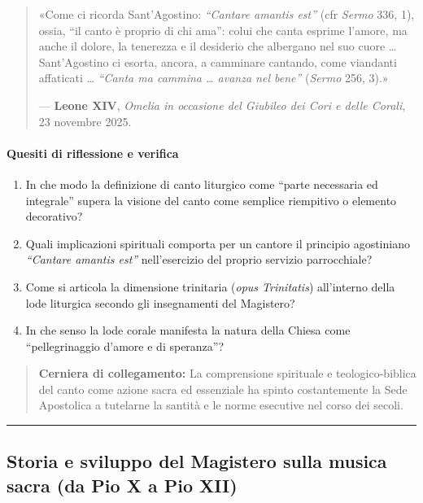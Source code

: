 \documentclass[12pt,a4paper]{article}
\begin{document}
	\begin{quote}
		«Come ci ricorda Sant'Agostino: \emph{``Cantare amantis est''} (cfr \emph{Sermo} 336, 1), ossia, ``il canto è proprio di chi ama'': colui che canta esprime l'amore, ma anche il dolore, la tenerezza e il desiderio che albergano nel suo cuore \ldots{} Sant'Agostino ci esorta, ancora, a camminare cantando, come viandanti affaticati \ldots{} \emph{``Canta ma cammina \ldots{} avanza nel bene''} (\emph{Sermo} 256, 3).»
		
		--- \textbf{Leone XIV}, \emph{Omelia in occasione del Giubileo dei Cori e delle Corali}, 23 novembre 2025.
	\end{quote}
	
	\paragraph{Quesiti di riflessione e verifica}\label{quesiti-di-riflessione-e-verifica}
	
	\begin{enumerate}[label=\arabic*.,leftmargin=*]
		\item In che modo la definizione di canto liturgico come ``parte necessaria ed integrale'' supera la visione del canto come semplice riempitivo o elemento decorativo?
		\item Quali implicazioni spirituali comporta per un cantore il principio agostiniano \emph{``Cantare amantis est''} nell'esercizio del proprio servizio parrocchiale?
		\item Come si articola la dimensione trinitaria (\emph{opus Trinitatis}) all'interno della lode liturgica secondo gli insegnamenti del Magistero?
		\item In che senso la lode corale manifesta la natura della Chiesa come ``pellegrinaggio d'amore e di speranza''?
	\end{enumerate}
	
	\begin{quote}
		\textbf{Cerniera di collegamento:} La comprensione spirituale e teologico-biblica del canto come azione sacra ed essenziale ha spinto costantemente la Sede Apostolica a tutelarne la santità e le norme esecutive nel corso dei secoli.
	\end{quote}
	
	\begin{center}\rule{0.5\linewidth}{0.5pt}\end{center}
	
	\subsection{Storia e sviluppo del Magistero sulla musica sacra (da Pio X a Pio XII)}\label{storia-e-sviluppo-del-magistero-sulla-musica-sacra-da-pio-x-a-pio-xii}
	
\end{document}
